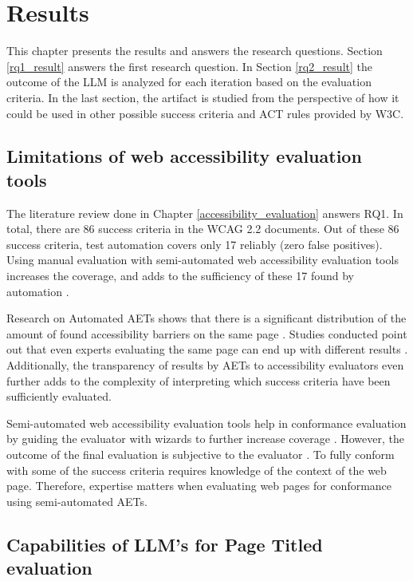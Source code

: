 \chapter{Results\label{results}}

This chapter presents the results and answers the research questions. Section \ref{rq1_result} answers the first research question. In Section \ref{rq2_result} the outcome of the LLM is analyzed for each iteration based on the evaluation criteria. In the last section, the artifact is studied from the perspective of how it could be used in other possible success criteria and ACT rules provided by W3C.

\section{Limitations of web accessibility evaluation tools\label{rq1_result}}

The literature review done in Chapter \ref{accessibility_evaluation} answers RQ1. In total, there are 86 success criteria in the WCAG 2.2 documents. Out of these 86 success criteria, test automation covers only 17 reliably (zero false positives). Using manual evaluation with semi-automated web accessibility evaluation tools increases the coverage, and adds to the sufficiency of these 17 found by automation \citep{dequecoverage_semi}.

Research on Automated AETs shows that there is a significant distribution of the amount of found accessibility barriers on the same page \citep{comparison_10.1145/3371300.3383346, tool_analysis_directive}. Studies conducted point out that even experts evaluating the same page can end up with different results \citep{10.1145/1878803.1878813_testability_expertise}. Additionally, the transparency of results by AETs to accessibility evaluators even further adds to the complexity of interpreting which success criteria have been sufficiently evaluated.

Semi-automated web accessibility evaluation tools help in conformance evaluation by guiding the evaluator with wizards to further increase coverage \citep{dequecoverage_semi}. However, the outcome of the final evaluation is subjective to the evaluator \citep{10.1145/1878803.1878813_testability_expertise}. To fully conform with some of the success criteria requires knowledge of the context of the web page. Therefore, expertise matters when evaluating web pages for conformance using semi-automated AETs.

\section{Capabilities of LLM's for Page Titled evaluation\label{rq2_result}}

